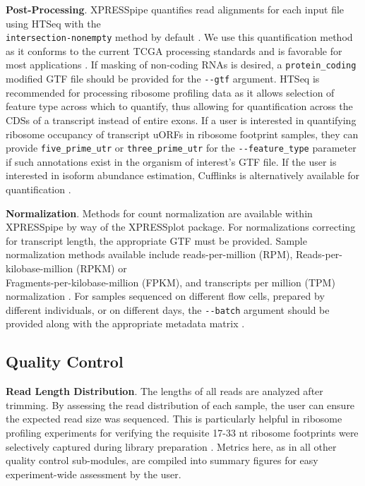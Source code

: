 \documentclass[10pt, oneside]{article}
\begin{document}
\noindent\textbf{Post-Processing}. XPRESSpipe quantifies read alignments for each input file using HTSeq with the \\\texttt{intersection-nonempty} method by default \cite{htseq, count_benchmark}. We use this quantification method as it conforms to the current TCGA processing standards and is favorable for most applications \cite{tcga}. If masking of non-coding RNAs is desired, a \texttt{protein\_coding} modified GTF file should be provided for the \texttt{-{}-gtf} argument. HTSeq is recommended for processing ribosome profiling data as it allows selection of feature type across which to quantify, thus allowing for quantification across the CDSs of a transcript instead of entire exons. If a user is interested in quantifying ribosome occupancy of transcript uORFs in ribosome footprint samples, they can provide \texttt{five\_prime\_utr} or \texttt{three\_prime\_utr} for the \texttt{-{}-feature\_type} parameter if such annotations exist in the organism of interest's GTF file. If the user is interested in isoform abundance estimation, Cufflinks is alternatively available for quantification \cite{cufflinks, count_benchmark}. \par

\noindent\textbf{Normalization}. Methods for count normalization are available within XPRESSpipe by way of the XPRESSplot package. For normalizations correcting for transcript length, the appropriate GTF must be provided. Sample normalization methods available include reads-per-million (RPM), Reads-per-kilobase-million (RPKM) or \\Fragments-per-kilobase-million (FPKM), and transcripts per million (TPM) normalization \cite{evans_briefbio}. For samples sequenced on different flow cells, prepared by different individuals, or on different days, the \texttt{-{}-batch} argument should be provided along with the appropriate metadata matrix \cite{sva}. \\

\subsection*{Quality Control}
\textbf{Read Length Distribution}. The lengths of all reads are analyzed after trimming. By assessing the read distribution of each sample, the user can ensure the expected read size was sequenced. This is particularly helpful in ribosome profiling experiments for verifying the requisite 17-33 nt ribosome footprints were selectively captured during library preparation \cite{ingolia_meth, fp_range}. Metrics here, as in all other quality control sub-modules, are compiled into summary figures for easy experiment-wide assessment by the user. \par
\end{document}
